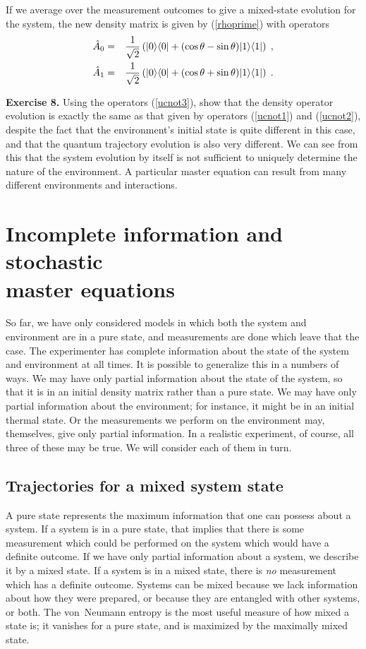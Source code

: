 \documentclass[12pt]{article}
\def\bra#1{{\langle #1 |}}
\def\ket#1{{| #1 \rangle}}
\def\A{{\hat A}}
\begin{document}
If we average over the measurement outcomes to give a mixed-state
evolution for the system, the new density matrix is given by
(\ref{rhoprime}) with operators
\begin{eqnarray}
\A_0 &=& {1\over\sqrt2} \left( \ket0\bra0
  + (\cos\theta-\sin\theta) \ket1\bra1 \right) \;, \nonumber\\
\A_1 &=& {1\over\sqrt2} \left(  \ket0\bra0
  + (\cos\theta+\sin\theta) \ket1\bra1 \right) \;.
\label{ucnot3}
\end{eqnarray}

\medskip\noindent
{\bf Exercise 8.}  Using the operators (\ref{ucnot3}), show that the
density operator evolution is exactly the same as that given by operators
(\ref{ucnot1}) and (\ref{ucnot2}), despite the fact that the environment's
initial state is quite different in this case, and that the quantum
trajectory evolution is also very different.  We can see from this that
the system evolution by itself is not sufficient to uniquely determine the
nature of the environment.  A particular master equation can result from
many different environments and interactions.
\medskip

\section{Incomplete information and stochastic \\ master equations}

So far, we have only considered models in which both the system and
environment are in a pure state, and measurements
are done which leave that the case.
The experimenter has complete information
about the state of the system and environment at all times.
It is possible to generalize this in a numbers of ways.  We may have only
partial information about the state of the system, so that it is in an
initial density matrix rather than a pure state.  We may have only partial
information about the environment; for instance, it might be in an initial
thermal state.  Or the measurements we perform on the environment may,
themselves, give only partial information.  In a realistic experiment,
of course, all three of these may be true.  We will consider each of
them in turn.

\subsection{Trajectories for a mixed system state}

A pure state represents the maximum information that one can possess about
a system.  If a system is in a pure state, that implies that there is
some measurement which could be performed on the system which would have
a definite outcome.  If we have only partial information about a system,
we describe it by a mixed state.  If a system is in a mixed state, there
is {\it no} measurement which has a definite outcome.  Systems can be
mixed because we lack information about how they were prepared, or because
they are entangled with other systems, or both.  The von~Neumann entropy
is the most useful measure of how mixed a state is; it vanishes for a
pure state, and is maximized by the maximally mixed state.
\end{document}
